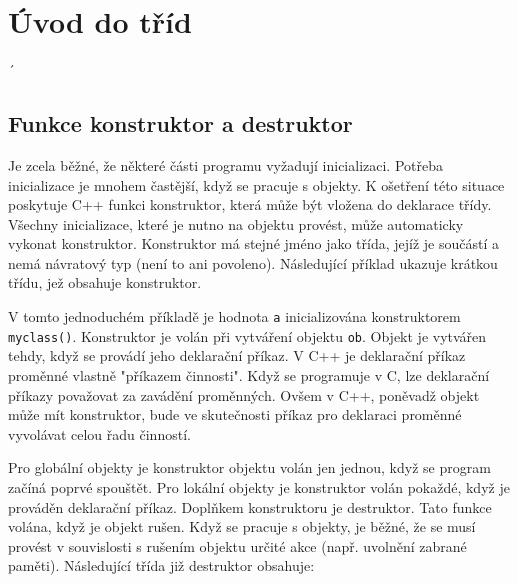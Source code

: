 \chapter{Úvod do tříd}
\minitoc
\newpage´
  \section{Funkce konstruktor a destruktor}
    Je zcela běžné, že některé části programu vyžadují inicializaci. Potřeba inicializace je mnohem častější, když se pracuje s objekty. K ošetření této situace poskytuje C++ funkci konstruktor, která může být vložena do deklarace třídy. Všechny inicializace, které je nutno na objektu provést, může automaticky vykonat konstruktor.
    Konstruktor má stejné jméno jako třída, jejíž je součástí a nemá návratový typ (není to ani povoleno). Následující příklad ukazuje krátkou třídu, jež obsahuje konstruktor.

    

    V tomto jednoduchém příkladě je hodnota \lstinline[basicstyle=\ttfamily]!a! inicializována konstruktorem \lstinline[basicstyle=\ttfamily]!myclass()!. Konstruktor je volán při vytváření objektu \lstinline[basicstyle=\ttfamily]!ob!. Objekt je vytvářen tehdy, když se provádí jeho deklarační příkaz. V C++ je deklarační příkaz proměnné vlastně "příkazem činnosti". Když se programuje v C, lze deklarační příkazy považovat za zavádění proměnných. Ovšem v C++, poněvadž objekt může mít konstruktor, bude ve skutečnosti příkaz pro deklaraci proměnné vyvolávat celou řadu činností.

    Pro globální objekty je konstruktor objektu volán jen jednou, když se program začíná poprvé spouštět. Pro lokální objekty je konstruktor volán pokaždé, když je prováděn deklarační příkaz.
    Doplňkem konstruktoru je destruktor. Tato funkce volána, když je objekt rušen. Když se pracuje s objekty, je běžné, že se musí provést v souvislosti s rušením objektu určité akce (např. uvolnění zabrané paměti). Následující třída již destruktor obsahuje:
    

